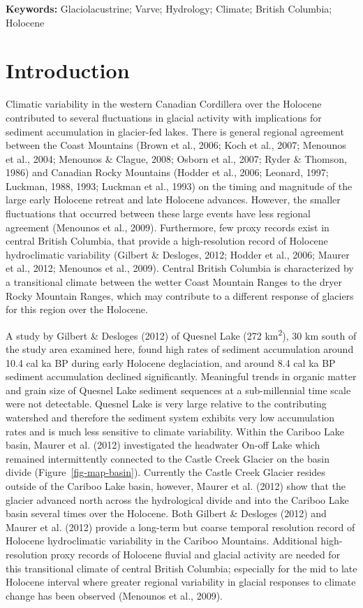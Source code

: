 \documentclass[
  letterpaper,
  DIV=11,
  numbers=noendperiod]{scrartcl}
\begin{document}
\textbf{Keywords:} Glaciolacustrine; Varve; Hydrology; Climate; British
Columbia; Holocene

\pagebreak

\hypertarget{introduction}{%
\section{Introduction}\label{introduction}}

Climatic variability in the western Canadian Cordillera over the
Holocene contributed to several fluctuations in glacial activity with
implications for sediment accumulation in glacier-fed lakes. There is
general regional agreement between the Coast Mountains (Brown et al.,
2006; Koch et al., 2007; Menounos et al., 2004; Menounos \& Clague,
2008; Osborn et al., 2007; Ryder \& Thomson, 1986) and Canadian Rocky
Mountains (Hodder et al., 2006; Leonard, 1997; Luckman, 1988, 1993;
Luckman et al., 1993) on the timing and magnitude of the large early
Holocene retreat and late Holocene advances. However, the smaller
fluctuations that occurred between these large events have less regional
agreement (Menounos et al., 2009). Furthermore, few proxy records exist
in central British Columbia, that provide a high-resolution record of
Holocene hydroclimatic variability (Gilbert \& Desloges, 2012; Hodder et
al., 2006; Maurer et al., 2012; Menounos et al., 2009). Central British
Columbia is characterized by a transitional climate between the wetter
Coast Mountain Ranges to the dryer Rocky Mountain Ranges, which may
contribute to a different response of glaciers for this region over the
Holocene.

A study by Gilbert \& Desloges (2012) of Quesnel Lake (272
km\textsuperscript{2}), 30 km south of the study area examined here,
found high rates of sediment accumulation around 10.4 cal ka BP during
early Holocene deglaciation, and around 8.4 cal ka BP sediment
accumulation declined significantly. Meaningful trends in organic matter
and grain size of Quesnel Lake sediment sequences at a sub-millennial
time scale were not detectable. Quesnel Lake is very large relative to
the contributing watershed and therefore the sediment system exhibits
very low accumulation rates and is much less sensitive to climate
variability. Within the Cariboo Lake basin, Maurer et al. (2012)
investigated the headwater On-off Lake which remained intermittently
connected to the Castle Creek Glacier on the basin divide
(Figure~\ref{fig-map-basin}). Currently the Castle Creek Glacier resides
outside of the Cariboo Lake basin, however, Maurer et al. (2012) show
that the glacier advanced north across the hydrological divide and into
the Cariboo Lake basin several times over the Holocene. Both Gilbert \&
Desloges (2012) and Maurer et al. (2012) provide a long-term but coarse
temporal resolution record of Holocene hydroclimatic variability in the
Cariboo Mountains. Additional high-resolution proxy records of Holocene
fluvial and glacial activity are needed for this transitional climate of
central British Columbia; especially for the mid to late Holocene
interval where greater regional variability in glacial responses to
climate change has been observed (Menounos et al., 2009).
\end{document}
